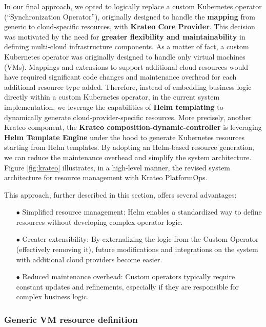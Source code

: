 In our final approach, we opted to logically replace a custom Kubernetes operator (``Synchronization Operator''), originally designed to handle the \textbf{mapping} from generic to cloud-specific resources, with \textbf{Krateo Core Provider}. 
This decision was motivated by the need for \textbf{greater flexibility and maintainability} in defining multi-cloud infrastructure components. 
As a matter of fact, a custom Kubernetes operator was originally designed to handle only virtual machines (VMs).
Mappings and extensions to support additional cloud resources would have required significant code changes and maintenance overhead for each additional resource type added.
Therefore, instead of embedding business logic directly within a custom Kubernetes operator, in the current system implementation, we leverage the capabilities of \textbf{Helm templating} to dynamically generate cloud-provider-specific resources. 
More precisely, another Krateo component, the \textbf{Krateo composition-dynamic-controller} is leveraging \textbf{Helm Template Engine} under the hood to generate Kubernetes resources starting from Helm templates.
By adopting an Helm-based resource generation, we can reduce the maintenance overhead and simplify the system architecture.
Figure \ref{fig:krateo} illustrates, in a high-level manner, the revised system architecture for resource management with Krateo PlatformOps.

This approach, further described in this section, offers several advantages:
\begin{itemize}[itemsep=0.2pt, topsep=1pt]
  \item[$\bullet$] Simplified resource management: Helm enables a standardized way to define resources without developing complex operator logic.
  \item[$\bullet$] Greater extensibility: By externalizing the logic from the Custom Operator (effectively removing it), future modifications and integrations on the system with additional cloud providers become easier.
  \item[$\bullet$] Reduced maintenance overhead: Custom operators typically require constant updates and refinements, especially if they are responsible for complex business logic. 
\end{itemize}

\subsubsection{Generic VM resource definition}

